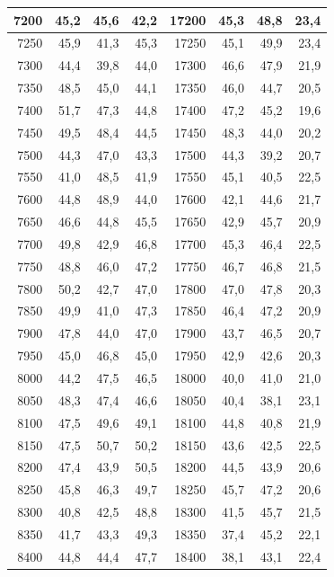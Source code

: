 \begin{small}
\begin{longtable}{|r|r|r|r|r|r|r|r|}
7200 & 45,2 & 45,6 & 42,2 & 17200 & 45,3 & 48,8 & 23,4 \\ \hline
7250 & 45,9 & 41,3 & 45,3 & 17250 & 45,1 & 49,9 & 23,4 \\ \hline
7300 & 44,4 & 39,8 & 44,0 & 17300 & 46,6 & 47,9 & 21,9 \\ \hline
7350 & 48,5 & 45,0 & 44,1 & 17350 & 46,0 & 44,7 & 20,5 \\ \hline
7400 & 51,7 & 47,3 & 44,8 & 17400 & 47,2 & 45,2 & 19,6 \\ \hline
7450 & 49,5 & 48,4 & 44,5 & 17450 & 48,3 & 44,0 & 20,2 \\ \hline
7500 & 44,3 & 47,0 & 43,3 & 17500 & 44,3 & 39,2 & 20,7 \\ \hline
7550 & 41,0 & 48,5 & 41,9 & 17550 & 45,1 & 40,5 & 22,5 \\ \hline
7600 & 44,8 & 48,9 & 44,0 & 17600 & 42,1 & 44,6 & 21,7 \\ \hline
7650 & 46,6 & 44,8 & 45,5 & 17650 & 42,9 & 45,7 & 20,9 \\ \hline
7700 & 49,8 & 42,9 & 46,8 & 17700 & 45,3 & 46,4 & 22,5 \\ \hline
7750 & 48,8 & 46,0 & 47,2 & 17750 & 46,7 & 46,8 & 21,5 \\ \hline
7800 & 50,2 & 42,7 & 47,0 & 17800 & 47,0 & 47,8 & 20,3 \\ \hline
7850 & 49,9 & 41,0 & 47,3 & 17850 & 46,4 & 47,2 & 20,9 \\ \hline
7900 & 47,8 & 44,0 & 47,0 & 17900 & 43,7 & 46,5 & 20,7 \\ \hline
7950 & 45,0 & 46,8 & 45,0 & 17950 & 42,9 & 42,6 & 20,3 \\ \hline
8000 & 44,2 & 47,5 & 46,5 & 18000 & 40,0 & 41,0 & 21,0 \\ \hline
8050 & 48,3 & 47,4 & 46,6 & 18050 & 40,4 & 38,1 & 23,1 \\ \hline
8100 & 47,5 & 49,6 & 49,1 & 18100 & 44,8 & 40,8 & 21,9 \\ \hline
8150 & 47,5 & 50,7 & 50,2 & 18150 & 43,6 & 42,5 & 22,5 \\ \hline
8200 & 47,4 & 43,9 & 50,5 & 18200 & 44,5 & 43,9 & 20,6 \\ \hline
8250 & 45,8 & 46,3 & 49,7 & 18250 & 45,7 & 47,2 & 20,6 \\ \hline
8300 & 40,8 & 42,5 & 48,8 & 18300 & 41,5 & 45,7 & 21,5 \\ \hline
8350 & 41,7 & 43,3 & 49,3 & 18350 & 37,4 & 45,2 & 22,1 \\ \hline
8400 & 44,8 & 44,4 & 47,7 & 18400 & 38,1 & 43,1 & 22,4 \\ \hline

\end{longtable}
\end{small}
